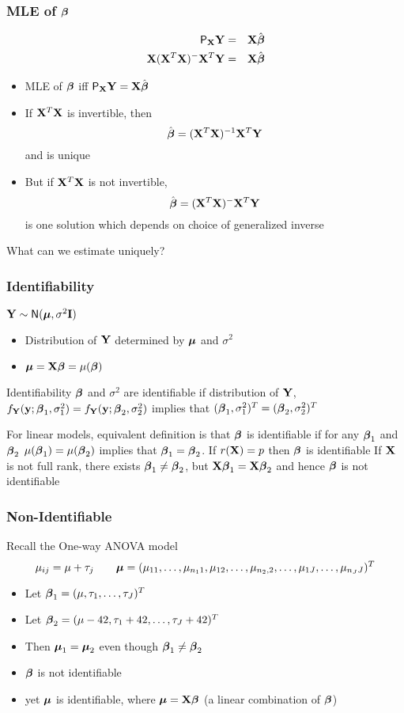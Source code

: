 \documentclass[handout]{beamer}
\begin{document}
\begin{frame}
  \frametitle{MLE of $\boldsymbol{\beta}$}
  \begin{eqnarray*}
    \textsf{P}_{\mathbf{X}} \mathbf{Y} & = & \mathbf{X} \hat{\boldsymbol{\beta}}  \\
\mathbf{X}(\mathbf{X}^T\mathbf{X})^- \mathbf{X}^T\mathbf{Y} & =
& \mathbf{X} \hat{\boldsymbol{\beta}} 
  \end{eqnarray*}  \pause
  \begin{itemize}
\item MLE of $\boldsymbol{\beta}$ iff $\textsf{P}_{\mathbf{X}} \mathbf{Y} = \mathbf{X} \hat{\boldsymbol{\beta}}$
\item If $\mathbf{X}^T\mathbf{X}$ is invertible, then
$$\hat{\boldsymbol{\beta}} = (\mathbf{X}^T\mathbf{X})^{-1} \mathbf{X}^T\mathbf{Y}$$ and is unique  \pause

\item But if $\mathbf{X}^T\mathbf{X}$ is  not invertible, $$\hat{\boldsymbol{\beta}} = (\mathbf{X}^T\mathbf{X})^{-} \mathbf{X}^T\mathbf{Y}$$ is
one solution which depends on choice of generalized inverse
 \pause
  \end{itemize}

What can we estimate uniquely?
\end{frame}
\begin{frame}
  \frametitle{Identifiability}
$\mathbf{Y} \sim \textsf{N}(\boldsymbol{\mu}, \sigma^2 \mathbf{I})$  \pause
  \begin{itemize}
  \item Distribution of $\mathbf{Y}$ determined by $\boldsymbol{\mu}$ and $\sigma^2$  \pause
\item $\boldsymbol{\mu} = \mathbf{X}\boldsymbol{\beta} = \mu(\boldsymbol{\beta})$  \pause
\end{itemize}
  \begin{block}{Identifiability}
$\boldsymbol{\beta}$ and $\sigma^2$ are identifiable if distribution of $\mathbf{Y}$, $f_{\mathbf{Y}}(\mathbf{y};
\boldsymbol{\beta}_1, \sigma^2_1) = f_{\mathbf{Y}}(\mathbf{y};
\boldsymbol{\beta}_2, \sigma^2_2)$ implies that $(\boldsymbol{\beta}_1, \sigma^2_1)^T =  (\boldsymbol{\beta}_2, \sigma^2_2)^T$
  \end{block}  \pause
For linear models, equivalent definition is that $\boldsymbol{\beta}$ is identifiable
if for any $\boldsymbol{\beta}_1$ and $\boldsymbol{\beta}_2$ $\mu(\boldsymbol{\beta}_1) = \mu(\boldsymbol{\beta}_2)$ implies that
$\boldsymbol{\beta}_1 = \boldsymbol{\beta}_2$.  If $ r(\mathbf{X}) = p$ then $\boldsymbol{\beta}$ is identifiable
 \pause
\vspace{12pt}
If $\mathbf{X}$ is not full rank, there exists $\boldsymbol{\beta}_1 \neq \boldsymbol{\beta}_2$, but $\mathbf{X}\boldsymbol{\beta}_1 =
\mathbf{X}\boldsymbol{\beta}_2$ and hence $\boldsymbol{\beta}$ is not identifiable
\end{frame}


\begin{frame}
\frametitle{Non-Identifiable }
  Recall the One-way ANOVA model \pause
$$\mu_{ij} = \mu + \tau_j \qquad \boldsymbol{\mu} = (
    \mu_{11}, \ldots,\mu_{n_1 1},\mu_{12},\ldots, \mu_{n_2,2},\ldots, \mu_{1J},
\ldots,
\mu_{n_J J})^T $$ \pause
\begin{itemize}
\item Let $\boldsymbol{\beta}_{1} = (\mu, \tau_1, \ldots, \tau_J)^T$ \pause
\item Let $\boldsymbol{\beta}_{2} = (\mu - 42, \tau_1 + 42, \ldots, \tau_J + 42)^T$ \pause
\item Then $\boldsymbol{\mu}_{1} = \boldsymbol{\mu}_{2}$ even though  $\boldsymbol{\beta}_1 \neq \boldsymbol{\beta}_2$ \pause
\item $\boldsymbol{\beta}$ is not identifiable \pause
\item yet  $\boldsymbol{\mu}$ is identifiable, where $\boldsymbol{\mu} = \mathbf{X} \boldsymbol{\beta}$  (a linear
  combination of $\boldsymbol{\beta}$) 
\end{itemize}
\end{frame}
\end{document}
